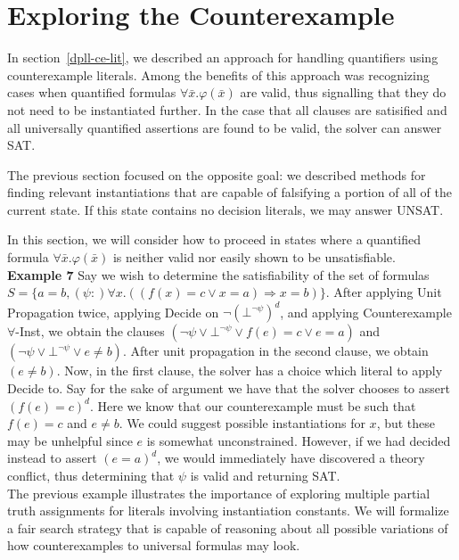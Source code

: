 \documentclass{llncs}
\begin{document}
\section{Exploring the Counterexample}

In section~\ref{dpll-ce-lit}, we described an approach for handling quantifiers using counterexample literals.
Among the benefits of this approach was recognizing cases when quantified formulas $\forall \bar{x}. \varphi( \bar{x} )$ are valid, thus signalling that they do not need to be instantiated further.
In the case that all clauses are satisified and all universally quantified assertions are found to be valid, the solver can answer SAT.

The previous section focused on the opposite goal: we described methods for finding relevant instantiations that are capable of falsifying a portion of all of the current state.
If this state contains no decision literals, we may answer UNSAT.

In this section, we will consider how to proceed in states where a quantified formula $\forall \bar{x}. \varphi( \bar{x} )$ is neither valid nor easily shown to be unsatisfiable. \\

{\bf Example 7} 
Say we wish to determine the satisfiability of the set of formulas $S = \{ a = b, (\psi :) \forall x. ((f(x) = c \vee x = a) \Rightarrow x = b) \}$.
After applying Unit Propagation twice, applying Decide on $\neg (\bot^{ \neg \psi })^d$, and applying Counterexample $\forall$-Inst, we obtain the clauses $( \neg \psi \vee \bot^{ \neg \psi } \vee f(e) = c \vee e = a )$ and $( \neg \psi \vee \bot^{ \neg \psi } \vee e \neq b )$.
After unit propagation in the second clause, we obtain $( e \neq b )$.
Now, in the first clause, the solver has a choice which literal to apply Decide to.
Say for the sake of argument we have that the solver chooses to assert $( f(e) = c )^d$.
Here we know that our counterexample must be such that $f( e ) = c$ and $e \neq b$.
We could suggest possible instantiations for $x$, but these may be unhelpful since $e$ is somewhat unconstrained.
However, if we had decided instead to assert $( e = a )^d$, we would immediately have discovered a theory conflict, thus determining that $\psi$ is valid and returning SAT. \\

The previous example illustrates the importance of exploring multiple partial truth assignments for literals involving instantiation constants.
We will formalize a fair search strategy that is capable of reasoning about all possible variations of how counterexamples to universal formulas may look.
\end{document}
